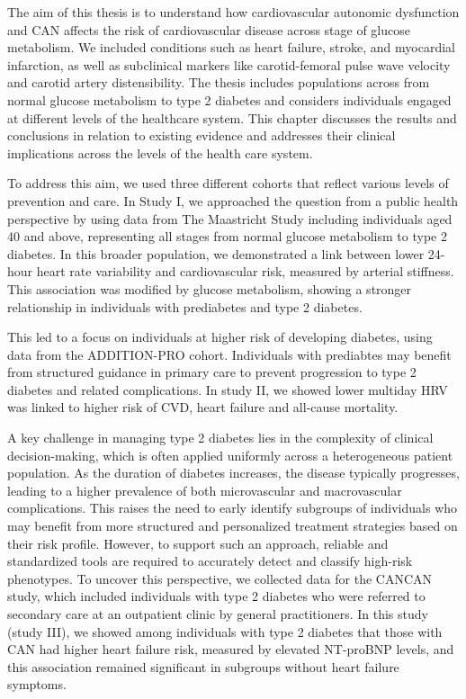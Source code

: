 \documentclass[
  a4paper,
  headsepline=true,
  open=any]{scrbook}
\begin{document}
The aim of this thesis is to understand how cardiovascular autonomic
dysfunction and CAN affects the risk of cardiovascular disease across
stage of glucose metabolism. We included conditions such as heart
failure, stroke, and myocardial infarction, as well as subclinical
markers like carotid-femoral pulse wave velocity and carotid artery
distensibility. The thesis includes populations across from normal
glucose metabolism to type 2 diabetes and considers individuals engaged
at different levels of the healthcare system. This chapter discusses the
results and conclusions in relation to existing evidence and addresses
their clinical implications across the levels of the health care system.

To address this aim, we used three different cohorts that reflect
various levels of prevention and care. In Study I, we approached the
question from a public health perspective by using data from The
Maastricht Study including individuals aged 40 and above, representing
all stages from normal glucose metabolism to type 2 diabetes. In this
broader population, we demonstrated a link between lower 24-hour heart
rate variability and cardiovascular risk, measured by arterial
stiffness. This association was modified by glucose metabolism, showing
a stronger relationship in individuals with prediabetes and type 2
diabetes.

This led to a focus on individuals at higher risk of developing
diabetes, using data from the ADDITION-PRO cohort. Individuals with
prediabtes may benefit from structured guidance in primary care to
prevent progression to type 2 diabetes and related complications. In
study II, we showed lower multiday HRV was linked to higher risk of CVD,
heart failure and all-cause mortality.

A key challenge in managing type 2 diabetes lies in the complexity of
clinical decision-making, which is often applied uniformly across a
heterogeneous patient population. As the duration of diabetes increases,
the disease typically progresses, leading to a higher prevalence of both
microvascular and macrovascular complications. This raises the need to
early identify subgroups of individuals who may benefit from more
structured and personalized treatment strategies based on their risk
profile. However, to support such an approach, reliable and standardized
tools are required to accurately detect and classify high-risk
phenotypes. To uncover this perspective, we collected data for the
CANCAN study, which included individuals with type 2 diabetes who were
referred to secondary care at an outpatient clinic by general
practitioners. In this study (study III), we showed among individuals
with type 2 diabetes that those with CAN had higher heart failure risk,
measured by elevated NT-proBNP levels, and this association remained
significant in subgroups without heart failure symptoms.
\end{document}
